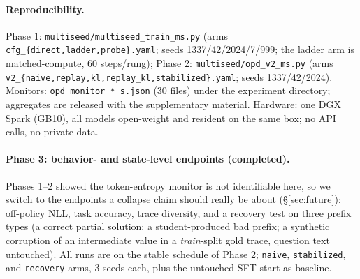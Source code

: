 \documentclass[11pt]{article}
\begin{document}
\paragraph{Reproducibility.} \label{sec:repro-ms} Phase 1: \texttt{multiseed/multiseed\_train\_ms.py} (arms \texttt{cfg\_\{direct,ladder,probe\}.yaml}; seeds 1337/42/2024/7/999; the ladder arm is matched-compute, 60 steps/rung); Phase 2: \texttt{multiseed/opd\_v2\_ms.py} (arms \texttt{v2\_\{naive,replay,kl,replay\_kl,stabilized\}.yaml}; seeds 1337/42/2024). Monitors: \texttt{opd\_monitor\_*\_s\*.json} (30 files) under the experiment directory; aggregates are released with the supplementary material. Hardware: one DGX Spark (GB10), all models open-weight and resident on the same box; no API calls, no private data.

\paragraph{Phase 3: behavior- and state-level endpoints (completed).} Phases 1--2 showed the token-entropy monitor is not identifiable here, so we switch to the endpoints a collapse claim should really be about (\S\ref{sec:future}): off-policy NLL, task accuracy, trace diversity, and a recovery test on three prefix types (a correct partial solution; a student-produced bad prefix; a synthetic corruption of an intermediate value in a \emph{train}-split gold trace, question text untouched). All runs are on the stable schedule of Phase 2; \texttt{naive}, \texttt{stabilized}, and \texttt{recovery} arms, 3 seeds each, plus the untouched SFT start as baseline.
\end{document}
